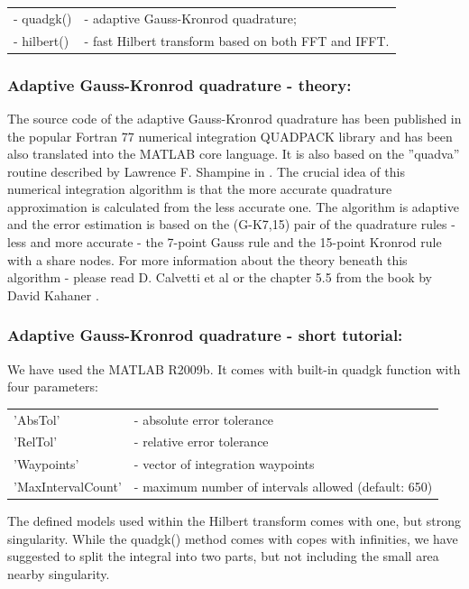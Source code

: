 \documentclass[12pt,twoside,a4paper]{article}
\numberwithin{equation}{subsection}
\numberwithin{figure}{subsection}
\begin{document}
\begin{tabular}{l l}
  - quadgk() &- adaptive Gauss-Kronrod quadrature; \\
  - hilbert() &- fast Hilbert transform based on both FFT and IFFT. \\
\end{tabular}


\subsubsection*{Adaptive Gauss-Kronrod quadrature - theory:}

The source code of the adaptive Gauss-Kronrod quadrature has been published in the popular Fortran 77 numerical integration QUADPACK library and has been also translated into the MATLAB core language. It is also based on the ''quadva'' routine described by Lawrence F. Shampine in \cite{shampine_vectorized}. The crucial idea of this numerical integration algorithm is that the more accurate quadrature approximation is calculated from the less accurate one. The algorithm is adaptive and the error estimation is based on the (G-K7,15) pair of the quadrature rules - less and more accurate - the 7-point Gauss rule and the 15-point Kronrod rule with a share nodes. For more information about the theory beneath this algorithm - please read D. Calvetti et al \cite{calvetti_computation} or the chapter 5.5 from the book by David Kahaner \cite{kahaner_numerical}.

\subsubsection*{Adaptive Gauss-Kronrod quadrature - short tutorial:}

We have used the MATLAB \textregistered R2009b. It comes with built-in quadgk function with four parameters:


\begin{tabular}{l l}
  'AbsTol'           & - absolute error tolerance \\
  'RelTol'           & - relative error tolerance \\
  'Waypoints'        & - vector of integration waypoints \\
  'MaxIntervalCount' & - maximum number of intervals allowed (default: 650) \\
\end{tabular}

The defined models used within the Hilbert transform comes with one, but strong singularity. While the quadgk() method comes with copes with infinities, we have suggested to split the integral into two parts, but not including the small area nearby singularity.
\end{document}
